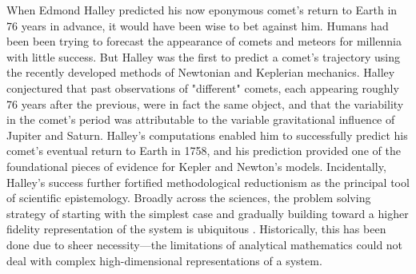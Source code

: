 \documentclass[]{article}
\begin{document}
When Edmond Halley predicted his now eponymous comet's return to Earth in 76 years in advance, it would have been wise to bet against him.
Humans had been been trying to forecast the appearance of comets and meteors for millennia with little success.
But Halley was the first to predict a comet's trajectory using the recently developed methods of Newtonian and Keplerian mechanics.
Halley conjectured that past observations of "different" comets, each appearing roughly 76 years after the previous, were in fact the same object, and that the variability in the comet's period was attributable to the variable gravitational influence of Jupiter and Saturn.
Halley's computations enabled him to successfully predict his comet's eventual return to Earth in 1758, and his prediction provided one of the foundational pieces of evidence for Kepler and Newton's models.
Incidentally, Halley's success further fortified methodological reductionism as the principal tool of scientific epistemology.
Broadly across the sciences, the problem solving strategy of starting with the simplest case and gradually building toward a higher fidelity representation of the system is ubiquitous \cite{polya_how_2009}.
Historically, this has been done due to sheer necessity---the limitations of analytical mathematics could not deal with complex high-dimensional representations of a system.
\end{document}
